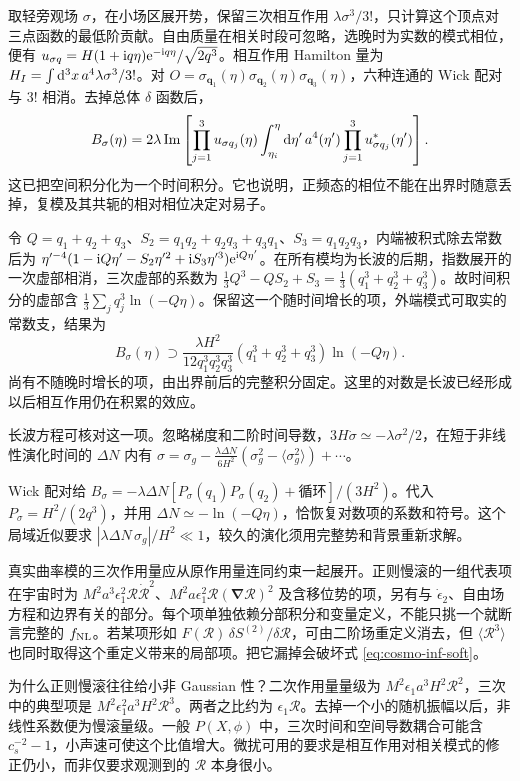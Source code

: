 取轻旁观场 $\sigma$，在小场区展开势，保留三次相互作用 $\lambda\sigma^3/3!$，只计算这个顶点对三点函数的最低阶贡献。自由质量在相关时段可忽略，选晚时为实数的模式相位，便有 $u_{\sigma q}=H(1+\mathrm{i} q\eta)\mathrm{e}^{-\mathrm{i} q\eta}/\sqrt{2q^3}$。相互作用 Hamilton 量为 $H_I=\int\dd^3x\,a^4\lambda\sigma^3/3!$。对 $O=\sigma_{\bm q_1}(\eta)\sigma_{\bm q_2}(\eta)\sigma_{\bm q_3}(\eta)$，六种连通的 Wick 配对与 $3!$ 相消。去掉总体 $\delta$ 函数后，
\[
 B_\sigma(\eta)=
 2\lambda\mathop{\rm Im}\left[
 \prod_{j=1}^3u_{\sigma q_j}(\eta)
 \int_{\eta_i}^{\eta}\dd\eta'\,a^4(\eta')
       \prod_{j=1}^3u_{\sigma q_j}^*(\eta')\right].
\]
这已把空间积分化为一个时间积分。它也说明，正频态的相位不能在出界时随意丢掉，复模及其共轭的相对相位决定对易子。

令 $Q=q_1+q_2+q_3$、$S_2=q_1q_2+q_2q_3+q_3q_1$、$S_3=q_1q_2q_3$，内端被积式除去常数后为 $\eta'^{-4}(1-\mathrm{i} Q\eta'-S_2\eta'^2+\mathrm{i} S_3\eta'^3)\mathrm{e}^{\mathrm{i} Q\eta'}$。在所有模均为长波的后期，指数展开的一次虚部相消，三次虚部的系数为 $\tfrac13Q^3-QS_2+S_3=\tfrac13(q_1^3+q_2^3+q_3^3)$。故时间积分的虚部含 $\tfrac13\sum_jq_j^3\ln(-Q\eta)$。保留这一个随时间增长的项，外端模式可取实的常数支，结果为
\[
 B_\sigma(\eta)\supset
 \frac{\lambda H^2}{12q_1^3q_2^3q_3^3}
 (q_1^3+q_2^3+q_3^3)\ln(-Q\eta).
\]
尚有不随晚时增长的项，由出界前后的完整积分固定。这里的对数是长波已经形成以后相互作用仍在积累的效应。

长波方程可核对这一项。忽略梯度和二阶时间导数，$3H\dot\sigma\simeq-\lambda\sigma^2/2$，在短于非线性演化时间的 $\Delta N$ 内有 $\sigma=\sigma_g-\frac{\lambda\Delta N}{6H^2} (\sigma_g^2-\langle\sigma_g^2\rangle)+\cdots$。

Wick 配对给 $B_\sigma=-\lambda\Delta N[P_\sigma(q_1)P_\sigma(q_2)+\text{循环}]/(3H^2)$。代入 $P_\sigma=H^2/(2q^3)$，并用 $\Delta N\simeq-\ln(-Q\eta)$，恰恢复对数项的系数和符号。这个局域近似要求 $|\lambda\Delta N\,\sigma_g|/H^2\ll1$，较久的演化须用完整势和背景重新求解。

真实曲率模的三次作用量应从原作用量连同约束一起展开。正则慢滚的一组代表项在宇宙时为 $M^2a^3\epsilon_1^2\mathcal R\dot{\mathcal R}^2$、$M^2a\epsilon_1^2\mathcal R(\bm\nabla\mathcal R)^2$ 及含移位势的项，另有与 $\dot\epsilon_2$、自由场方程和边界有关的部分。每个项单独依赖分部积分和变量定义，不能只挑一个就断言完整的 $f_{\rm NL}$。若某项形如 $F(\mathcal R)\,\delta S^{(2)}/\delta\mathcal R$，可由二阶场重定义消去，但 $\langle\mathcal R^3\rangle$ 也同时取得这个重定义带来的局部项。把它漏掉会破坏式 \eqref{eq:cosmo-inf-soft}。

为什么正则慢滚往往给小非 Gaussian 性？二次作用量量级为 $M^2\epsilon_1 a^3H^2\mathcal R^2$，三次中的典型项是 $M^2\epsilon_1^2a^3H^2\mathcal R^3$。两者之比约为 $\epsilon_1\mathcal R$。去掉一个小的随机振幅以后，非线性系数便为慢滚量级。一般 $P(X,\phi)$ 中，三次时间和空间导数耦合可能含 $c_s^{-2}-1$，小声速可使这个比值增大。微扰可用的要求是相互作用对相关模式的修正仍小，而非仅要求观测到的 $\mathcal R$ 本身很小。

